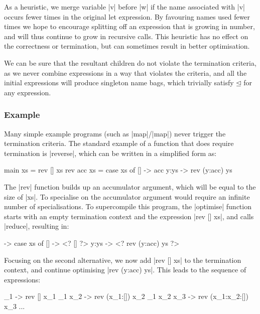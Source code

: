 \documentclass[draft]{sigplanconf}
\begin{document}
As a heuristic, we merge variable |v| before |w| if the name associated with |v| occurs fewer times in the original let expression. By favouring names used fewer times we hope to encourage splitting off an expression that is growing in number, and will thus continue to grow in recursive calls. This heuristic has no effect on the correctness or termination, but can sometimes result in better optimisation.

We can be sure that the resultant children do not violate the termination criteria, as we never combine expressions in a way that violates the criteria, and all the initial expressions will produce singleton name bags, which trivially satisfy $\unlhd$ for any expression.

\subsubsection{Example}
\label{sec:term_example}

Many simple example programs (such as |map|/|map|) never trigger the termination criteria. The standard example of a function that does require termination is |reverse|, which can be written in a simplified form as:

\begin{code}
main xs = rev [] xs
rev acc xs = case  xs of
                   []    -> acc
                   y:ys  -> rev (y:acc) ys
\end{code}

The |rev| function builds up an accumulator argument, which will be equal to the size of |xs|. To specialise on the accumulator argument would require an infinite number of specialisations. To supercompile this program, the |optimise| function starts with an empty termination context and the expression |rev [] xs|, and calls |reduce|, resulting in:

\begin{code}
\xs -> case  xs of
             []    -> <? [] ?>
             y:ys  -> <? rev (y:acc) ys ?>
\end{code}

Focusing on the second alternative, we now add |rev [] xs| to the termination context, and continue optimising |rev (y:acc) ys|. This leads to the sequence of expressions:

\begin{code}
\x_1 -> rev [] x_1
\x_1 x_2 -> rev (x_1:[]) x_2
\x_1 x_2 x_3 -> rev (x_1:x_2:[]) x_3
...
\end{code}
\end{document}
